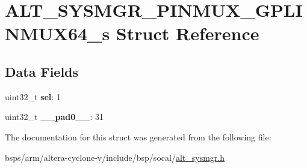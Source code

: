 \hypertarget{structALT__SYSMGR__PINMUX__GPLINMUX64__s}{}\section{A\+L\+T\+\_\+\+S\+Y\+S\+M\+G\+R\+\_\+\+P\+I\+N\+M\+U\+X\+\_\+\+G\+P\+L\+I\+N\+M\+U\+X64\+\_\+s Struct Reference}
\label{structALT__SYSMGR__PINMUX__GPLINMUX64__s}
\subsection*{Data Fields}
\begin{DoxyCompactItemize}
\item 
\mbox{\label{structALT__SYSMGR__PINMUX__GPLINMUX64__s_a1013effb4337196f687c843cc75f9e37}} 
uint32\+\_\+t {\bfseries sel}\+: 1
\item 
\mbox{\label{structALT__SYSMGR__PINMUX__GPLINMUX64__s_ae02d9613eafbb9b89b29bc7c5fba99e5}} 
uint32\+\_\+t {\bfseries \+\_\+\+\_\+pad0\+\_\+\+\_\+}\+: 31
\end{DoxyCompactItemize}


The documentation for this struct was generated from the following file\+:\begin{DoxyCompactItemize}
\item 
bsps/arm/altera-\/cyclone-\/v/include/bsp/socal/\mbox{\hyperlink{alt__sysmgr_8h}{alt\+\_\+sysmgr.\+h}}\end{DoxyCompactItemize}
